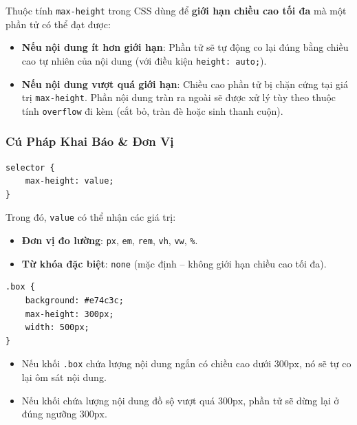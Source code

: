 \documentclass[11pt,oneside]{book}
\newcommand{\codeinline}[1]{\textcolor{accentOrange}{\texttt{#1}}}
\begin{document}
\begin{conceptBox}
Thuộc tính \codeinline{max-height} trong CSS dùng để \textbf{giới hạn chiều cao tối đa} mà một phần tử có thể đạt được:
\begin{itemize}[leftmargin=1.2em, itemsep=3pt, parsep=0pt]
    \item \textbf{Nếu nội dung ít hơn giới hạn}: Phần tử sẽ tự động co lại đúng bằng chiều cao tự nhiên của nội dung (với điều kiện \codeinline{height: auto;}).
    \item \textbf{Nếu nội dung vượt quá giới hạn}: Chiều cao phần tử bị chặn cứng tại giá trị \codeinline{max-height}. Phần nội dung tràn ra ngoài sẽ được xử lý tùy theo thuộc tính \codeinline{overflow} đi kèm (cắt bỏ, tràn đè hoặc sinh thanh cuộn).
\end{itemize}
\end{conceptBox}

\subsubsection{Cú Pháp Khai Báo \& Đơn Vị}

\begin{codeWindow}
\begin{lstlisting}[language=CSS3]
selector {
    max-height: value;
}
\end{lstlisting}
\end{codeWindow}

Trong đó, \codeinline{value} có thể nhận các giá trị:
\begin{itemize}[leftmargin=1.5em, itemsep=3pt, parsep=0pt]
    \item \textbf{Đơn vị đo lường}: \codeinline{px}, \codeinline{em}, \codeinline{rem}, \codeinline{vh}, \codeinline{vw}, \codeinline{\%}.
    \item \textbf{Từ khóa đặc biệt}: \codeinline{none} (mặc định -- không giới hạn chiều cao tối đa).
\end{itemize}

\begin{codeWindow}
\begin{lstlisting}[language=CSS3]
.box {
    background: #e74c3c;
    max-height: 300px;
    width: 500px;
}
\end{lstlisting}
\end{codeWindow}

\begin{itemize}[leftmargin=1.5em, itemsep=3pt, parsep=0pt]
    \item Nếu khối \codeinline{.box} chứa lượng nội dung ngắn có chiều cao dưới $300\text{px}$, nó sẽ tự co lại ôm sát nội dung.
    \item Nếu khối chứa lượng nội dung đồ sộ vượt quá $300\text{px}$, phần tử sẽ dừng lại ở đúng ngưỡng $300\text{px}$.
\end{itemize}
\end{document}

